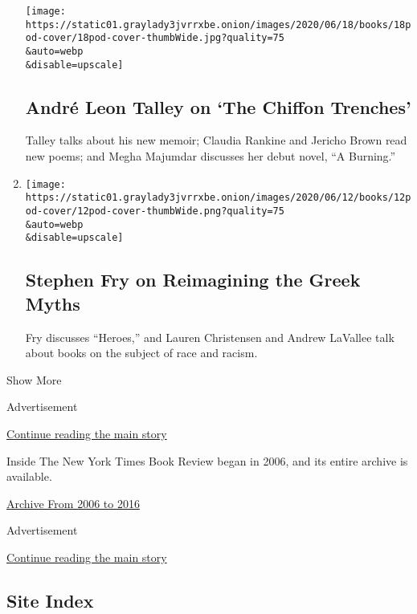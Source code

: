 \begin{enumerate}
  \texttt{[image: https://static01.graylady3jvrrxbe.onion/images/2020/06/18/books/18pod-cover/18pod-cover-thumbWide.jpg?quality=75\\\&auto=webp\\\&disable=upscale]}

  \hypertarget{andruxe9-leon-talley-on-the-chiffon-trenches}{%
  \subsection{André Leon Talley on `The Chiffon
  Trenches'}\label{andruxe9-leon-talley-on-the-chiffon-trenches}}

  Talley talks about his new memoir; Claudia Rankine and Jericho Brown
  read new poems; and Megha Majumdar discusses her debut novel, ``A
  Burning.''
\item
  \href{/2020/06/12/books/review/podcast-stephen-fry-heroes-greek-myths.html}{}

  \texttt{[image: https://static01.graylady3jvrrxbe.onion/images/2020/06/12/books/12pod-cover/12pod-cover-thumbWide.png?quality=75\\\&auto=webp\\\&disable=upscale]}

  \hypertarget{stephen-fry-on-reimagining-the-greek-myths}{%
  \subsection{Stephen Fry on Reimagining the Greek
  Myths}\label{stephen-fry-on-reimagining-the-greek-myths}}

  Fry discusses ``Heroes,'' and Lauren Christensen and Andrew LaVallee
  talk about books on the subject of race and racism.
\end{enumerate}

Show More

Advertisement

\protect\hyperlink{after-mid1}{Continue reading the main story}

Inside The New York Times Book Review began in 2006, and its entire
archive is available.

\href{http://www.nytimes3xbfgragh.onion/ref/books/books-podcast-archive.html}{Archive
From 2006 to 2016}

Advertisement

\protect\hyperlink{after-mktg}{Continue reading the main story}

\hypertarget{site-index}{%
\subsection{Site Index}\label{site-index}}

